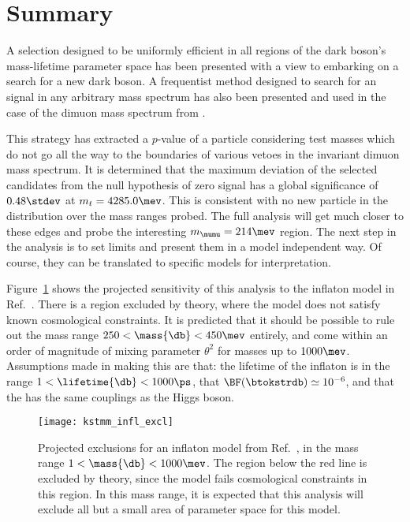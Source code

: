 \section{Summary}

A selection designed to be uniformly efficient in all regions of the dark boson's mass-lifetime
parameter space has been presented with a view to embarking on a search for a new dark boson.
A frequentist method designed to search for an signal in any arbitrary mass spectrum has also been
presented and used in the case of the dimuon mass spectrum from \btokstrmumu.

This strategy has extracted a $p$-value of a particle considering test masses which do not go all
the way to the boundaries of various vetoes in the invariant dimuon mass spectrum.
It is determined that the maximum deviation of the selected candidates from the null hypothesis of
zero signal has a global significance of $0.48\stdev$ at $m_t = 4285.0\mev$.
This is consistent with no new particle in the \mumu distribution over the mass ranges probed.
The full analysis will get much closer to these edges and probe the interesting $m_{\mumu}=214\mev$
region.
The next step in the analysis is to set limits and present them in a model independent way.
Of course, they can be translated to specific models for interpretation.


Figure~\ref{fig:db:excl:infl} shows the projected
sensitivity of this analysis to the inflaton model in Ref.~\cite{Bezrukov:2014nza}.
There is a region excluded by theory, where the model does not satisfy known cosmological
constraints.
It is predicted that it should be possible to rule out the mass range
$250<\mass{\db}<450\mev$ entirely, and come within an order of magnitude of mixing parameter
$\theta^2$ for masses up to $1000\mev$.
Assumptions made in making this are that: the lifetime of the inflaton is in the range
$1<\lifetime{\db}<1000\ps$, that $\BF(\btokstrdb)\simeq10^{-6}$,
and that the \db has the same couplings as the Higgs boson.

\begin{figure}
  \begin{center}
    \texttt{[image: kstmm\_infl\_excl]}
    \caption[Projected sensitivity in an inflaton search]
    {
      Projected exclusions for an inflaton model from Ref.~\protect\cite{Bezrukov:2014nza}, in the
      mass range $1<\mass{\db}<1000\mev$.
      The region below the red line is excluded by theory, since the model fails cosmological
      constraints in this region.
      In this mass range, it is expected that this analysis will exclude all but a small area of
      parameter space for this model.
    }
    \label{fig:db:excl:infl}
  \end{center}
\end{figure}

